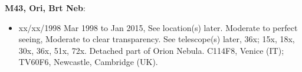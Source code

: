 {\bf M43, Ori, Brt Neb}:
\begin{itemize}
\item xx/xx/1998 Mar 1998 to Jan 2015, See location(s) later. Moderate to perfect seeing, Moderate to clear transparency. See telescope(s) later, 36x; 15x, 18x, 30x, 36x, 51x, 72x. Detached part of Orion Nebula. C114F8, Venice (IT); TV60F6, Newcastle, Cambridge (UK).
\end{itemize}
